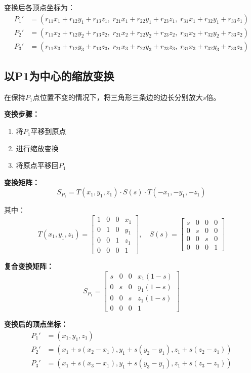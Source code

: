 \documentclass[12pt,a4paper]{article}
\begin{document}
变换后各顶点坐标为：
\begin{align*}
P_1' &= (r_{11}x_1 + r_{12}y_1 + r_{13}z_1, \; r_{21}x_1 + r_{22}y_1 + r_{23}z_1, \; r_{31}x_1 + r_{32}y_1 + r_{33}z_1) \\
P_2' &= (r_{11}x_2 + r_{12}y_2 + r_{13}z_2, \; r_{21}x_2 + r_{22}y_2 + r_{23}z_2, \; r_{31}x_2 + r_{32}y_2 + r_{33}z_2) \\
P_3' &= (r_{11}x_3 + r_{12}y_3 + r_{13}z_3, \; r_{21}x_3 + r_{22}y_3 + r_{23}z_3, \; r_{31}x_3 + r_{32}y_3 + r_{33}z_3)
\end{align*}

\subsection{以P1为中心的缩放变换}

在保持$P_1$点位置不变的情况下，将三角形三条边的边长分别放大$s$倍。

\textbf{变换步骤：}
\begin{enumerate}
    \item 将$P_1$平移到原点
    \item 进行缩放变换
    \item 将原点平移回$P_1$
\end{enumerate}

\textbf{变换矩阵：}
\[
S_{P_1} = T(x_1, y_1, z_1) \cdot S(s) \cdot T(-x_1, -y_1, -z_1)
\]

其中：
\[
T(x_1, y_1, z_1) = \begin{bmatrix}
1 & 0 & 0 & x_1 \\
0 & 1 & 0 & y_1 \\
0 & 0 & 1 & z_1 \\
0 & 0 & 0 & 1
\end{bmatrix}, \quad
S(s) = \begin{bmatrix}
s & 0 & 0 & 0 \\
0 & s & 0 & 0 \\
0 & 0 & s & 0 \\
0 & 0 & 0 & 1
\end{bmatrix}
\]

\textbf{复合变换矩阵：}
\[
S_{P_1} = \begin{bmatrix}
s & 0 & 0 & x_1(1-s) \\
0 & s & 0 & y_1(1-s) \\
0 & 0 & s & z_1(1-s) \\
0 & 0 & 0 & 1
\end{bmatrix}
\]

\textbf{变换后的顶点坐标：}
\begin{align*}
P_1' &= (x_1, y_1, z_1) \\
P_2' &= (x_1 + s(x_2 - x_1), y_1 + s(y_2 - y_1), z_1 + s(z_2 - z_1)) \\
P_3' &= (x_1 + s(x_3 - x_1), y_1 + s(y_3 - y_1), z_1 + s(z_3 - z_1))
\end{align*}
\end{document}
